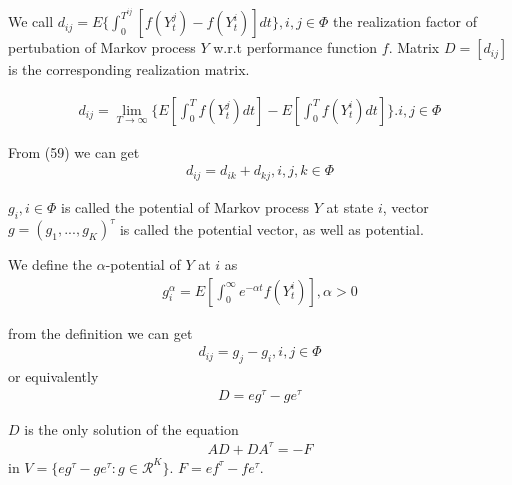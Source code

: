 \documentclass[runningheads]{llncs}
\begin{document}
    \begin{definition}
        We call $d_{ij} = E \{ \int_0^{T^{ij}} [ f(Y_t^j) - f(Y_t^i) ] dt \}, i, j \in \Phi$
        the realization factor of pertubation of Markov process $Y$ w.r.t performance function $f$.
        Matrix $D = [d_{ij}]$ is the corresponding realization matrix.
    \end{definition}

    \begin{lemma}
        \begin{align}
            d_{ij} = \mathop{\lim}_{T \rightarrow \infty} \{ E [ \int_0^T f(Y_t^j)dt ] -  E [ \int_0^T f(Y_t^i)dt ] \}. i, j \in \Phi
        \end{align}
    \end{lemma}
    \par
    From (59) we can get
    \begin{align}
        d_{ij} = d_{ik} + d_{kj}, i, j, k \in \Phi
    \end{align}
    \begin{definition}
        $g_i, i \in \Phi$ is called the potential of Markov process $Y$ at state $i$,
        vector $g = ( g_1, ..., g_K)^\tau$ is called the potential vector, as well as potential.
        \par
        We define the $\alpha$-potential of $Y$ at $i$ as
        \begin{align}
            g_i^\alpha = E [ \int_0^\infty e^{-\alpha t}f(Y_t^i)], \alpha > 0
        \end{align}
    \end{definition}
    from the definition we can get
    \begin{align}
        d_{ij} = g_j - g_i, i, j \in \Phi
    \end{align}
    or equivalently
    \begin{align}
        D = eg^\tau - ge^\tau
    \end{align}
    \begin{lemma}
        $D$ is the only solution of the equation
        \begin{align}
            AD + DA^\tau = -F
        \end{align}
        in $V = \{ eg^\tau - ge^\tau: g \in \mathcal{R}^K \}$.
        $F = ef^\tau - fe^\tau$.
    \end{lemma}
\end{document}
